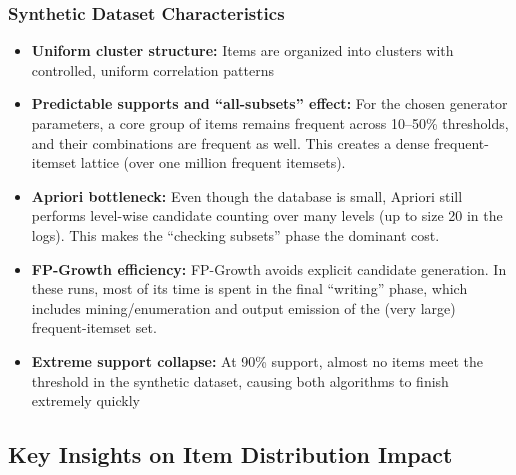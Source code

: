 \documentclass[11pt]{article}
\begin{document}
\subsubsection{Synthetic Dataset Characteristics}

\begin{itemize}
    \item \textbf{Uniform cluster structure:} Items are organized into clusters with controlled, uniform correlation patterns
    
    \item \textbf{Predictable supports and ``all-subsets'' effect:} For the chosen generator parameters, a core group of items remains frequent across 10--50\% thresholds, and their combinations are frequent as well. This creates a dense frequent-itemset lattice (over one million frequent itemsets).
    
    \item \textbf{Apriori bottleneck:} Even though the database is small, Apriori still performs level-wise candidate counting over many levels (up to size 20 in the logs). This makes the ``checking subsets'' phase the dominant cost.
    
    \item \textbf{FP-Growth efficiency:} FP-Growth avoids explicit candidate generation. In these runs, most of its time is spent in the final ``writing'' phase, which includes mining/enumeration and output emission of the (very large) frequent-itemset set.
    
    \item \textbf{Extreme support collapse:} At 90\% support, almost no items meet the threshold in the synthetic dataset, causing both algorithms to finish extremely quickly
\end{itemize}

\subsection{Key Insights on Item Distribution Impact}
\end{document}
